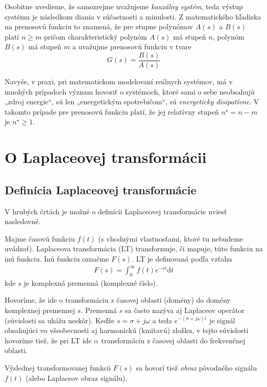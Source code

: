 \documentclass[a4paper, 10pt, ]{article}
\begin{document}
Osobitne uvedieme, že samozrejme uvažujeme \emph{kauzálny systém}, teda výstup systému je následkom diania v súčastnosti a minulosti. Z matematického hľadiska na prenosovú funkciu to znamená, že pre stupne polynómov $A(s)$ a $B(s)$ platí $n \geq m$ pričom charakteristický polynóm $A(s)$ má stupeň $n$, polynóm $B(s)$ má stupeň $m$ a uvažujme prenosovú funkciu v tvare
\begin{equation}
    G(s) = \frac{B(s)}{A(s)}
\end{equation}

Navyše, v praxi, pri matematickom modelovaní reálnych systémov, má v mnohých prípadoch význam hovoriť o systémoch, ktoré sami o sebe neobsahujú „zdroj energie“, sú len „energetickým spotrebičom“, sú \emph{energeticky disipatívne}. V takomto prípade pre prenosovú funkciu platí, že jej relatívny stupeň $n^\star = n-m$ je $n^\star \geq 1$.




\section{O Laplaceovej transformácii}


\subsection{Definícia Laplaceovej transformácie}

V hrubých črtách je možné o definícii Laplaceovej transformácie uviesť nasledovné.

Majme časovú funkciu $f(t)$ (s vhodnými vlastnosťami, ktoré tu nebudeme uvádzať). Laplaceova transformácia (LT) transformuje, či mapuje, túto funkciu na inú funkciu. Inú funkciu označme $F(s)$. LT je definovaná podľa vzťahu
\begin{align}
    F(s) = \int_0^\infty f(t) e^{-st}\text{d}t
\end{align}
kde $s$ je komplexná premenná (komplexné číslo).


Hovoríme, že ide o transformáciu z časovej oblasti (domény) do domény komplexnej premennej $s$. Premenná $s$ sa často nazýva aj Laplaceov operátor (súvislosti sa ukážu neskôr). Keďže $s = \sigma + j\omega$ a teda $e^{-(\sigma + j\omega)t}$ je signál obsahujúci vo všeobecnosti aj harmonickú (kmitavú) zložku, v tejto súvislosti hovoríme tiež, že pri LT ide o~transformáciu z časovej oblasti do frekvenčnej oblasti.

Výslednej transformovanej funkcii $F(s)$ sa hovorí tiež \emph{obraz} pôvodného signálu $f(t)$ (alebo Laplaceov obraz signálu).
\end{document}
